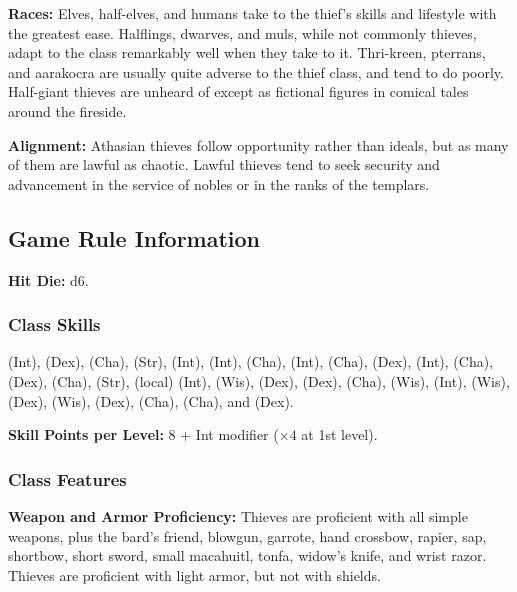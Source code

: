 \textbf{Races:} Elves, half-elves, and humans take to the thief's skills and lifestyle with the greatest ease. Halflings, dwarves, and muls, while not commonly thieves, adapt to the class remarkably well when they take to it. Thri-kreen, pterrans, and aarakocra are usually quite adverse to the thief class, and tend to do poorly. Half-giant thieves are unheard of except as fictional figures in comical tales around the fireside.

\textbf{Alignment:} Athasian thieves follow opportunity rather than ideals, but as many of them are lawful as chaotic. Lawful thieves tend to seek security and advancement in the service of nobles or in the ranks of the templars.

\subsection{Game Rule Information}
\textbf{Hit Die:} d6.

\subsubsection{Class Skills}
 (Int),  (Dex),  (Cha),  (Str),  (Int),  (Int),  (Cha),  (Int),  (Cha),  (Dex),  (Int),  (Cha),  (Dex),  (Cha),  (Str),  (local) (Int),  (Wis),  (Dex),  (Dex),  (Cha),  (Wis),  (Int),  (Wis),  (Dex),  (Wis),  (Dex),  (Cha),  (Cha), and  (Dex).

\textbf{Skill Points per Level:} 8 + Int modifier ($\times4$ at 1st level).

\subsubsection{Class Features}
\textbf{Weapon and Armor Proficiency:} Thieves are proficient with all simple weapons, plus the bard's friend, blowgun, garrote, hand crossbow, rapier, sap, shortbow, short sword, small macahuitl, tonfa, widow's knife, and wrist razor. Thieves are proficient with light armor, but not with shields.

